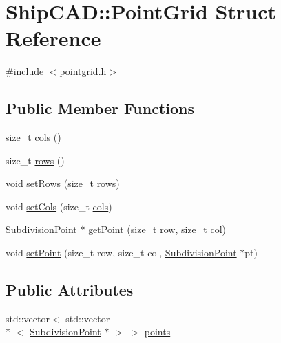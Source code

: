 \hypertarget{structShipCAD_1_1PointGrid}{\section{Ship\-C\-A\-D\-:\-:Point\-Grid Struct Reference}
\label{structShipCAD_1_1PointGrid}
}


{\ttfamily \#include $<$pointgrid.\-h$>$}

\subsection*{Public Member Functions}
\begin{DoxyCompactItemize}
\item 
size\-\_\-t \hyperlink{structShipCAD_1_1PointGrid_a7c4b8397c5a6dfcb88f91412bc1ea5e2}{cols} ()
\item 
size\-\_\-t \hyperlink{structShipCAD_1_1PointGrid_a2bd6eecd15643afb29bd7de2f891b614}{rows} ()
\item 
void \hyperlink{structShipCAD_1_1PointGrid_a6f0b92dc55d7df73c25fbf10552c8f4a}{set\-Rows} (size\-\_\-t \hyperlink{structShipCAD_1_1PointGrid_a2bd6eecd15643afb29bd7de2f891b614}{rows})
\item 
void \hyperlink{structShipCAD_1_1PointGrid_a3f8dccba61161a2baf323e2a2961e132}{set\-Cols} (size\-\_\-t \hyperlink{structShipCAD_1_1PointGrid_a7c4b8397c5a6dfcb88f91412bc1ea5e2}{cols})
\item 
\hyperlink{classShipCAD_1_1SubdivisionPoint}{Subdivision\-Point} $\ast$ \hyperlink{structShipCAD_1_1PointGrid_ac550e1688340f55d1dae9ec8c370ee31}{get\-Point} (size\-\_\-t row, size\-\_\-t col)
\item 
void \hyperlink{structShipCAD_1_1PointGrid_aa2c44687569cebc64f33a7840ea5c1b0}{set\-Point} (size\-\_\-t row, size\-\_\-t col, \hyperlink{classShipCAD_1_1SubdivisionPoint}{Subdivision\-Point} $\ast$pt)
\end{DoxyCompactItemize}
\subsection*{Public Attributes}
\begin{DoxyCompactItemize}
\item 
std\-::vector$<$ std\-::vector\\*
$<$ \hyperlink{classShipCAD_1_1SubdivisionPoint}{Subdivision\-Point} $\ast$ $>$ $>$ \hyperlink{structShipCAD_1_1PointGrid_acb874cfa2bdda20e8a996e0e1a153feb}{points}
\end{DoxyCompactItemize}


